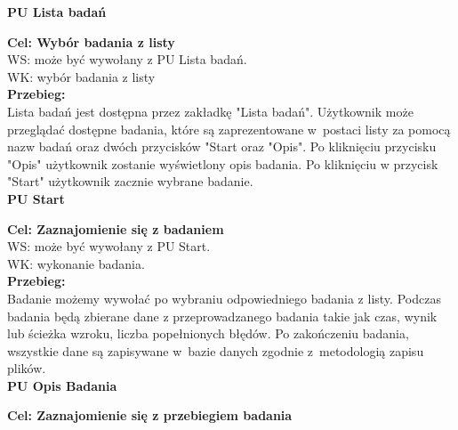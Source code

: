 \documentclass[12pt, letterpaper]{article}
\begin{document}
		
		\textbf{PU Lista badań}
		
		\quad
		
		\textbf{Cel: Wybór badania z listy}\\
		
		WS: może być wywołany z PU Lista badań.\\
		
		WK: wybór badania z listy\\
		
		\textbf{Przebieg:}\\
		Lista badań jest dostępna przez zakładkę "Lista badań". Użytkownik może przeglądać dostępne badania, które są zaprezentowane w~postaci listy za pomocą nazw badań oraz dwóch przycisków "Start oraz "Opis". Po kliknięciu przycisku "Opis" użytkownik zostanie wyświetlony opis badania. Po kliknięciu w przycisk "Start" użytkownik zacznie wybrane badanie. \\
		
		
		\textbf{PU Start}
		
		\quad
		
		\textbf{Cel: Zaznajomienie się z badaniem}\\
		
		WS: może być wywołany z PU Start.\\
		
		WK: wykonanie badania.\\
		
		\textbf{Przebieg: }\\
		Badanie możemy wywołać po wybraniu odpowiedniego badania z listy. Podczas badania będą zbierane dane z przeprowadzanego badania takie jak czas, wynik lub ścieżka wzroku, liczba popełnionych błędów. Po zakończeniu badania, wszystkie dane są zapisywane w~bazie danych zgodnie z~metodologią zapisu plików.
		 \\
		 
		
		\textbf{PU Opis Badania}
		
		\quad
		
		\textbf{Cel: Zaznajomienie się z przebiegiem badania}\\
		
\end{document}

